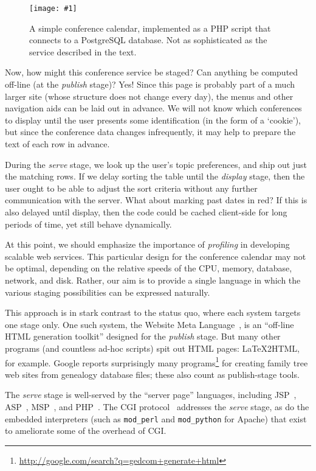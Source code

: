 \documentclass[preprint]{acm_proc_article-sp}
\newcommand{\myfig}[3]{%
  \begin{figure}[tbp]%
    #3%
    \caption{#2}%
    \label{fig:#1}%
  \end{figure}}
\newcommand{\screenshot}[2]{%
  \myfig{#1}{#2}
  {\centering%
    \texttt{[image: \#1]}}}
\begin{document}
\screenshot{confcal}{A simple conference calendar, implemented as a
  PHP script that connects to a PostgreSQL database.  Not as
  sophisticated as the service described in the text.}

Now, how might this conference service be staged?  Can
anything be computed off-line (at the \emph{publish} stage)?
Yes!  Since this page is probably part of a much larger site
(whose structure does not change every day), the menus and
other navigation aids can be laid out in advance.  We will
not know which conferences to display until the user
presents some identification (in the form of a `cookie'),
but since the conference data changes infrequently, it may
help to prepare the text of each row in advance.

During the \emph{serve} stage, we look up the user's topic
preferences, and ship out just the matching rows.  If we delay
sorting the table until the \emph{display} stage, then the user
ought to be able to adjust the sort criteria without any
further communication with the server.  What about marking
past dates in red?  If this is also delayed until display,
then the code could be cached client-side for long periods
of time, yet still behave dynamically.

At this point, we should emphasize the importance of
\emph{profiling} in developing scalable web services.  This
particular design for the conference calendar may not be
optimal, depending on the relative speeds of the CPU,
memory, database, network, and disk.  Rather, our aim is to
provide a single language in which the various staging
possibilities can be expressed naturally.

This approach is in stark contrast to the status quo, where each
system targets one stage only.  One such system, the Website Meta
Language~\cite{engelschall-wml}, is an ``off-line HTML generation
toolkit'' designed for the \emph{publish} stage.  But many other
programs (and countless ad-hoc scripts) spit out HTML pages:
\LaTeX2HTML, for example.  Google reports surprisingly many
programs\footnote{\url{http://google.com/search?q=gedcom+generate+html}}
for creating family tree web sites from genealogy database files;
these also count as publish-stage tools.

The \emph{serve} stage is well-served by the ``server page''
languages, including JSP~\cite{sun-jsp},
ASP~\cite{microsoft-asp},
MSP~\cite{elsman03web}, and
PHP~\cite{bakken04php}.  The CGI protocol~\cite{w3c-cgi}
addresses the \emph{serve} stage, as do the embedded
interpreters (such as \texttt{mod\_perl} and
\texttt{mod\_python} for Apache) that exist to ameliorate some
of the overhead of CGI.
\end{document}
